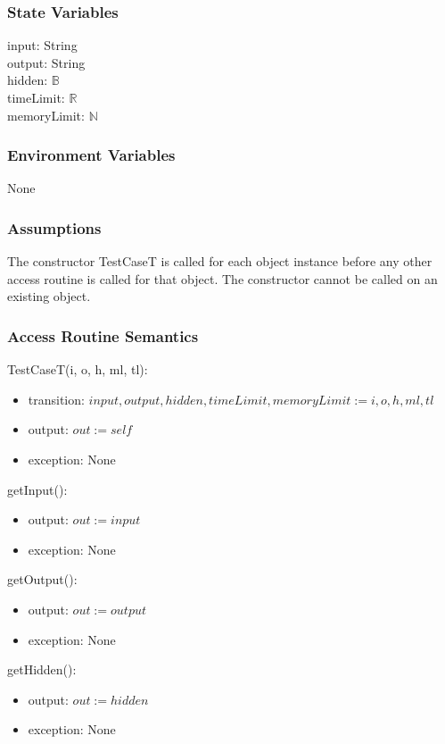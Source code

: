 \documentclass[12pt, titlepage]{article}
\begin{document}
\subsubsection{State Variables}
input: String\\
output: String\\
hidden: $\mathbb{B}$\\
timeLimit: $\mathbb{R}$\\
memoryLimit: $\mathbb{N}$

\subsubsection{Environment Variables}
None

\subsubsection{Assumptions}
The constructor TestCaseT is called for each object instance before any other access routine is called for that object. The constructor cannot be called on an existing object.

\subsubsection{Access Routine Semantics}

\noindent TestCaseT(i, o, h, ml, tl):
\begin{itemize}
\item transition: $input, output, hidden, timeLimit, memoryLimit := i, o, h, ml, tl$
\item output: $out := self$
\item exception: None
\end{itemize}

\noindent getInput():
\begin{itemize}
\item output: $out := input$
\item exception: None
\end{itemize}

\noindent getOutput():
\begin{itemize}
\item output: $out := output$
\item exception: None
\end{itemize}

\noindent getHidden():
\begin{itemize}
\item output: $out := hidden$
\item exception: None
\end{itemize}
\end{document}
